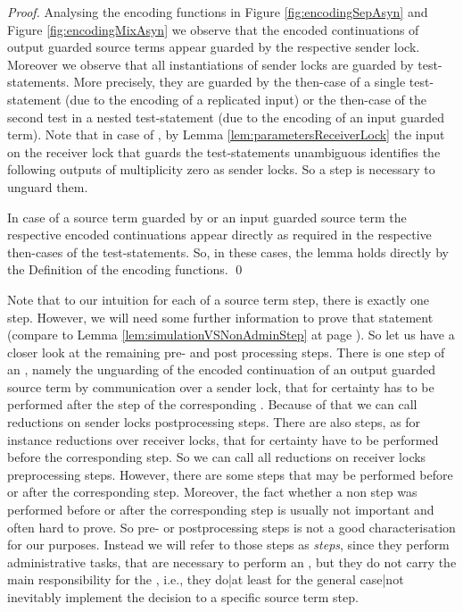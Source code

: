 \documentclass[]{llncs}
\begin{document}
\begin{proof}
	Analysing the encoding functions in Figure \ref{fig:encodingSepAsyn} and Figure \ref{fig:encodingMixAsyn} we observe that the encoded continuations of output guarded source terms appear guarded by the respective sender lock. Moreover we observe that all instantiations of sender locks are guarded by test-statements. More precisely, they are guarded by the then-case of a single test-statement (due to the encoding of a replicated input) or the then-case of the second test in a nested test-statement (due to the encoding of an input guarded term). Note that in case of , by Lemma \ref{lem:parametersReceiverLock} the input on the receiver lock that guards the test-statements unambiguous identifies the following outputs of multiplicity zero as sender locks. So a \nonAdmin step is necessary to unguard them.
	
	In case of a source term guarded by  or an input guarded source term the respective encoded continuations appear directly as required in the respective then-cases of the test-statements. So, in these cases, the lemma holds directly by the Definition of the encoding functions.
	\qed
\end{proof}

Note that to our intuition for each \simulation of a source term step, there is exactly one \nonAdmin step. However, we will need some further information to prove that statement (compare to Lemma \ref{lem:simulationVSNonAdminStep} at page \pageref{lem:simulationVSNonAdminStep}). So let us have a closer look at the remaining pre- and post processing steps. There is one step of an \simulation, namely the unguarding of the encoded continuation of an output guarded source term by communication over a sender lock, that for certainty has to be performed after the \nonAdmin step of the corresponding \simulation. Because of that we can call reductions on sender locks postprocessing steps. There are also steps, as for instance reductions over receiver locks, that for certainty have to be performed before the corresponding \nonAdmin step. So we can call all reductions on receiver locks preprocessing steps. However, there are some steps that may be performed before or after the corresponding \nonAdmin step. Moreover, the fact whether a non \nonAdmin step was performed before or after the corresponding \nonAdmin step is usually not important and often hard to prove. So pre- or postprocessing steps is not a good characterisation for our purposes. Instead we will refer to those steps as \emph{\admin steps}, since they perform administrative tasks, that are necessary to perform an \simulation, but they do not carry the main responsibility for the \simulation, i.e., they do|at least for the general case|not inevitably implement the decision to \simulate a specific source term step.
\end{document}

